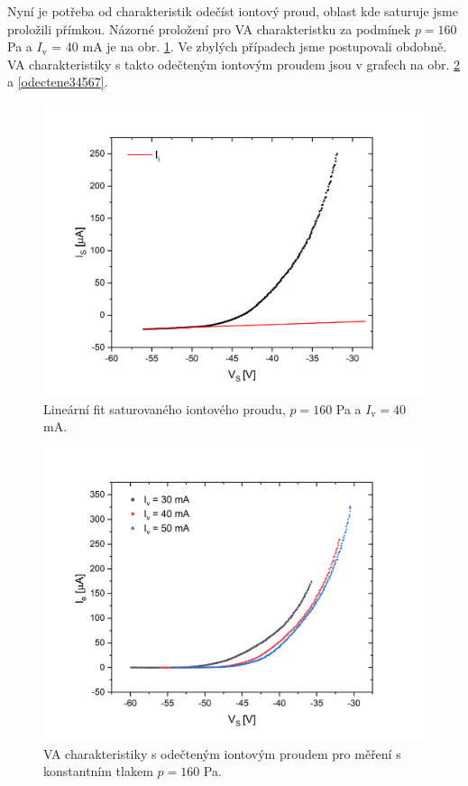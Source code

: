 \documentclass[a4paper,12pt]{article}
\begin{document}
\newpage
Nyní je potřeba od charakteristik odečíst iontový proud, oblast kde saturuje jsme proložili 
přímkou. Názorné proložení pro VA
charakteristku za podmínek $p = 160$ \si{\pascal} a $I_\text{v}$ = 40 \si{\milli\ampere} je na obr. \ref{iiont}. Ve zbylých případech
jsme postupovali obdobně. VA charakteristiky s takto odečteným iontovým proudem jsou v grafech na obr. \ref{odectene012} a
\ref{odectene34567}.

\begin{figure}[h]
	\centering
	\includegraphics[width=145mm]{iiont.png}
	\caption{Lineární fit saturovaného iontového proudu, $p = 160$ \si{\pascal} a $I_\text{v} = 40$ \si{\milli\ampere}.}
	\label{iiont}
\end{figure}

\newpage
\begin{figure}[h!]
	\centering
	\includegraphics[width=135mm]{odectene012.png}
	\caption{VA charakteristiky s odečteným iontovým proudem pro měření s konstantním tlakem $p = 160$ \si{\pascal}.}
	\label{odectene012}
\end{figure}
\end{document}
